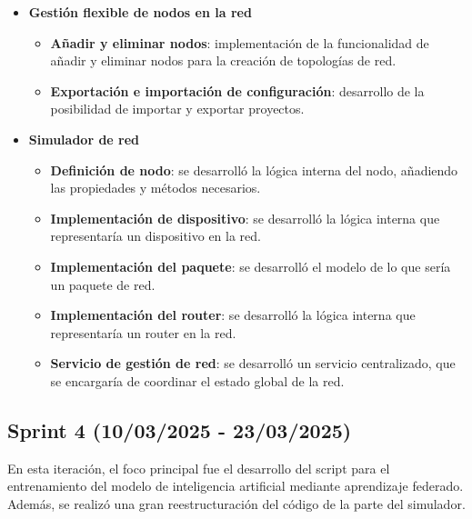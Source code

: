 \begin{itemize}
    \item \textbf{Gestión flexible de nodos en la red}
    \begin{itemize}
        \item \textbf{Añadir y eliminar nodos}: implementación de la funcionalidad de añadir y eliminar nodos para la creación de topologías de red.
        \item \textbf{Exportación e importación de configuración}: desarrollo de la posibilidad de importar y exportar proyectos.
    \end{itemize}
    \item \textbf{Simulador de red}
    \begin{itemize}
        \item \textbf{Definición de nodo}: se desarrolló la lógica interna del nodo, añadiendo las propiedades y métodos necesarios.
        \item \textbf{Implementación de dispositivo}: se desarrolló la lógica interna que representaría un dispositivo en la red.
        \item \textbf{Implementación del paquete}: se desarrolló el modelo de lo que sería un paquete de red.
        \item \textbf{Implementación del router}: se desarrolló la lógica interna que representaría un router en la red.
        \item \textbf{Servicio de gestión de red}: se desarrolló un servicio centralizado, que se encargaría de coordinar el estado global de la red.
    \end{itemize}
\end{itemize}

\subsection{Sprint 4 (10/03/2025 - 23/03/2025)}
\label{subsec:CuartoSprint}
En esta iteración, el foco principal fue el desarrollo del script para el entrenamiento del modelo de inteligencia artificial mediante aprendizaje federado. Además, se realizó una gran reestructuración del código de la parte del simulador. 

